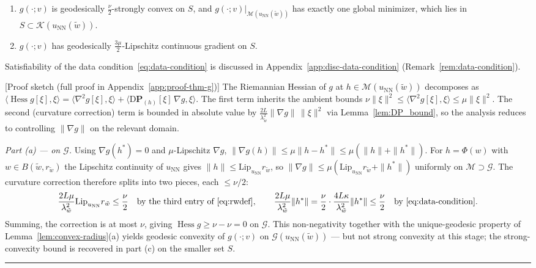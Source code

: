 \documentclass[twoside,11pt]{article}
\newcommand{\BlackBoxProof}{\rule{1.5ex}{1.5ex}}
\renewenvironment{proof}{\par\noindent{\bf Proof\ }}{\hfill\BlackBoxProof\par\medskip}
\renewcommand{\P}{\mathbf{P}}
\newcommand{\D}{\mathrm{D}}
\newcommand{\Hess}{\operatorname{Hess} }
\newcommand{\NN}{\mathrm{NN}}
\newcommand{\Lip}{\mathrm{Lip}}
\newcommand{\calG}{\mathcal{G}}
\newcommand{\calK}{\mathcal{K}}
\newcommand{\calM}{\mathcal{M}}
\begin{document}
\begin{theorem}
\begin{enumerate}
    \item[(c).] $g(\cdot;v)$ is geodesically $\tfrac{\nu}{2}$-strongly convex on $S$, and $g(\cdot;v)|_{\calM(u_\NN(\tilde w))}$ has exactly one global minimizer, which lies in $S \subset \calK(u_\NN(\tilde w))$.

    \item[(d).] $g(\cdot;v)$ has geodesically $\tfrac{3\mu}{2}$-Lipschitz continuous gradient on $S$.
\end{enumerate}
\end{theorem}

Satisfiability of the data condition~\eqref{eq:data-condition} is discussed in Appendix~\ref{app:disc-data-condition} (Remark~\ref{rem:data-condition}).

\begin{proof}[Proof sketch (full proof in Appendix~\ref{app:proof-thm-g})]
The Riemannian Hessian of $g$ at $h\in\calM(u_\NN(\tilde w))$ decomposes as
$\langle \Hess g[\xi],\xi\rangle = \langle \nabla^2 g[\xi],\xi\rangle + \langle \D\P_{(h)}[\xi]\,\nabla g,\xi\rangle$.
The first term inherits the ambient bounds $\nu\|\xi\|^2 \le \langle \nabla^2 g[\xi],\xi\rangle \le \mu\|\xi\|^2$.
The second (curvature correction) term is bounded in absolute value by $\frac{2L}{\lambda_{\tilde w}^2}\|\nabla g\|\,\|\xi\|^2$ via Lemma~\ref{lem:DP_bound}, so the analysis reduces to controlling $\|\nabla g\|$ on the relevant domain.

\smallskip\noindent\emph{Part (a) — on $\calG$.}
Using $\nabla g(h^*)=0$ and $\mu$-Lipschitz $\nabla g$, $\|\nabla g(h)\|\le\mu\|h-h^*\|\le\mu(\|h\|+\|h^*\|)$. For $h=\Phi(w)$ with $w\in B(\tilde w,r_{\tilde w})$ the Lipschitz continuity of $u_\NN$ gives $\|h\|\le \Lip_{u_\NN}r_{\tilde w}$, so $\|\nabla g\|\le \mu(\Lip_{u_\NN}r_{\tilde w}+\|h^*\|)$ uniformly on $\calM\supset\calG$. The curvature correction therefore splits into two pieces, each $\le \nu/2$:
\[
\frac{2L\mu}{\lambda_{\tilde w}^2}\Lip_{u_\NN}r_{\tilde w}\le\frac{\nu}{2}
\quad\text{by the third entry of~\eqref{eq:rwdef}},\qquad
\frac{2L\mu}{\lambda_{\tilde w}^2}\|h^*\|=\frac{\nu}{2}\cdot\frac{4L\kappa}{\lambda_{\tilde w}^2}\|h^*\|\le\frac{\nu}{2}
\quad\text{by~\eqref{eq:data-condition}}.
\]
Summing, the correction is at most $\nu$, giving $\Hess g\ge\nu-\nu=0$ on $\calG$. This non-negativity together with the unique-geodesic property of Lemma~\ref{lem:convex-radius}(a) yields geodesic convexity of $g(\cdot;v)$ on $\calG(u_\NN(\tilde w))$ --- but not strong convexity at this stage; the strong-convexity bound is recovered in part (c) on the smaller set $S$.


\end{proof}
\end{document}
